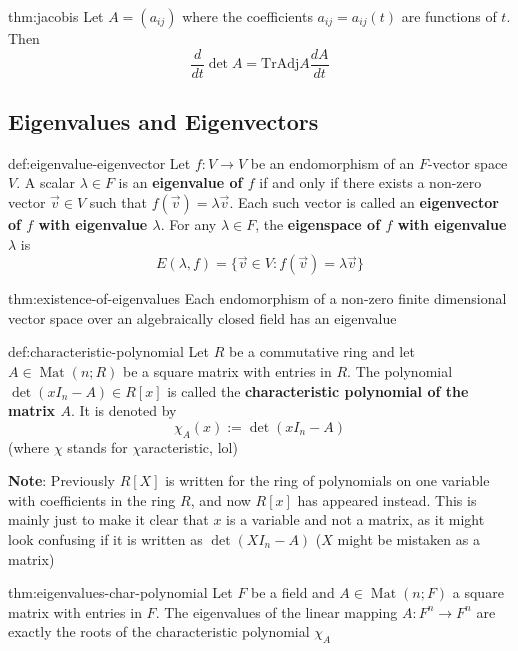 \documentclass{article}
\DeclareMathOperator{\Mat}{Mat}
\begin{document}
\begin{thm}{thm:jacobis}{}
    Let $A = (a_{ij})$ where the coefficients $a_{ij} = a_{ij}(t)$ are functions of $t$. Then
    \[\frac{d}{dt} \det A = \text{Tr}\text{Adj} A \frac{dA}{dt}\]
\end{thm}

\newpage
\subsection{Eigenvalues and Eigenvectors}

\begin{dfn}{def:eigenvalue-eigenvector}{}
    Let $f: V \to V $ be an endomorphism of an $F$-vector space $V$. A scalar $\lambda\in F$ is an \textbf{eigenvalue of $f$} if and only if there exists a non-zero vector $\vec{v}\in V$ such that $f(\vec{v}) = \lambda \vec{v}$. Each such vector is called an \textbf{eigenvector of $f$ with eigenvalue $\lambda$}. For any $\lambda\in F$, the \textbf{eigenspace of $f$ with eigenvalue $\lambda$} is
    \[E(\lambda, f) = \{\vec{v}\in V : f(\vec{v}) = \lambda \vec{v}\}\]
\end{dfn}

\begin{thm}{thm:existence-of-eigenvalues}{}
    Each endomorphism of a non-zero finite dimensional vector space over an algebraically closed field has an eigenvalue
\end{thm}

\begin{dfn}{def:characteristic-polynomial}{}
    Let $R$ be a commutative ring and let $A\in \Mat(n;R)$ be a square matrix with entries in $R$. The polynomial $\det(x I_{n} - A)\in R[x]$ is called the \textbf{characteristic polynomial of the matrix $A$}. It is denoted by
    \[\chi_{A}(x) := \det(x I_{n} - A)\]
    (where $\chi$ stands for $\chi$aracteristic, lol)
\end{dfn}

\textbf{Note}: Previously $R[X]$ is written for the ring of polynomials on one variable with coefficients in the ring $R$, and now $R[x]$ has appeared instead. This is mainly just to make it clear that $x$ is a variable and not a matrix, as it might look confusing if it is written as $\det(X I_{n} - A)$ ($X$ might be mistaken as a matrix)

\begin{thm}{thm:eigenvalues-char-polynomial}{}
    Let $F$ be a field and $A\in \Mat(n;F)$ a square matrix with entries in $F$. The eigenvalues of the linear mapping $A : F^{n}\to F^{n}$ are exactly the roots of the characteristic polynomial $\chi_{A}$
\end{thm}
\end{document}
